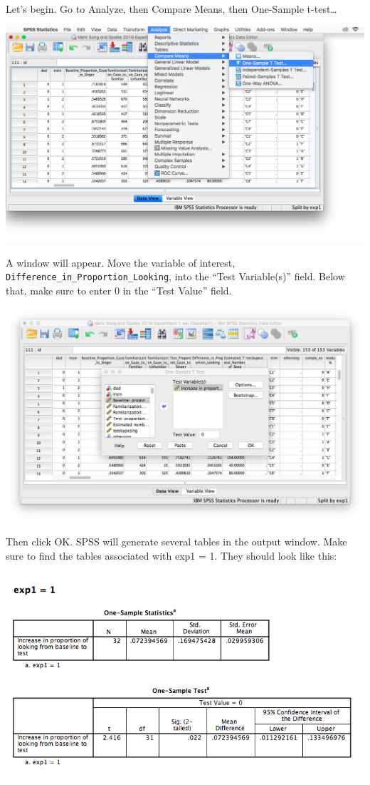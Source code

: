 \documentclass[
]{book}
\begin{document}
Let's begin. Go to {Analyze}, then {Compare Means}, then {One-Sample t-test\ldots{}}

\includegraphics{img/6.4.31.png}

A window will appear. Move the variable of interest, \texttt{Difference\_in\_Proportion\_Looking}, into the ``Test Variable(s)'' field. Below that, make sure to enter 0 in the ``Test Value'' field.

\includegraphics{img/6.4.32.png}

Then click {OK}. SPSS will generate several tables in the output window. Make sure to find the tables associated with exp1 = 1. They should look like this:

\includegraphics{img/6.4.33.png}
\end{document}
